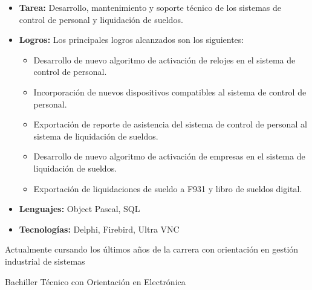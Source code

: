 \documentclass[10pt,a4paper]{altacv}
\begin{document}
\begin{itemize}
\item \textbf {Tarea:} Desarrollo, mantenimiento y soporte técnico de los sistemas de control de personal y liquidación de sueldos.
 \item \textbf {Logros:} Los principales logros alcanzados son los siguientes:
    \begin{itemize}
    \item Desarrollo de nuevo algoritmo de activación de relojes en el sistema de control de personal.
    \item Incorporación de nuevos dispositivos compatibles al sistema de control de personal.
    \item Exportación de reporte de asistencia del sistema de control de personal al sistema de liquidación de sueldos.
    \item Desarrollo de nuevo algoritmo de activación de empresas en el sistema de liquidación de sueldos.
    \item Exportación de liquidaciones de sueldo a F931 y libro de sueldos digital.
  \end{itemize}
 \item \textbf {Lenguajes:} Object Pascal, SQL
 \item \textbf {Tecnologías:} Delphi, Firebird, Ultra VNC
\end{itemize}



Actualmente cursando los últimos años de la carrera con orientación en gestión industrial de sistemas

\divider

Bachiller Técnico con Orientación en Electrónica

\clearpage

\end{document}

